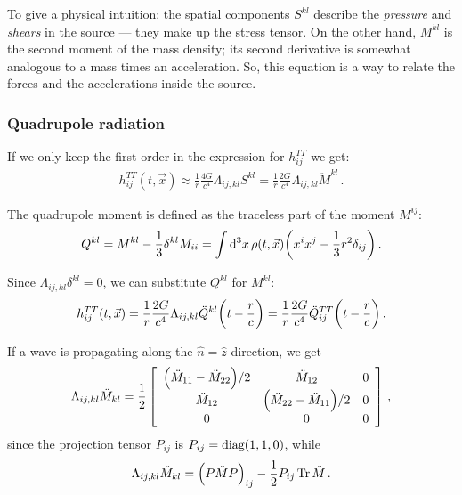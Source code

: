\documentclass[main.tex]{subfiles}
\begin{document}
To give a physical intuition: the spatial components \(S^{kl}\) describe the \emph{pressure} and \emph{shears} in the source --- they make up the stress tensor. On the other hand, \(M^{kl}\) is the second moment of the mass density; its second derivative is somewhat analogous to a mass times an acceleration. So, this equation is a way to relate the forces and the accelerations inside the source.

\subsubsection{Quadrupole radiation}

If we only keep the first order in the expression for \(h^{TT}_{ij} \) we get: 
%
\begin{align}
h_{ij}^{TT} (t, \vec{x}) \approx \frac{1}{r} \frac{4G}{c^{4}} \Lambda_{ij, kl} S^{kl}
= \frac{1}{r} \frac{2G}{c^{4}} \Lambda_{ij,kl} \ddot{M}^{kl}
\,.
\end{align}

The quadrupole moment is defined as the traceless part of the moment \(M^{ij}\):
%
\begin{align}
Q^{kl} = M^{kl} - \frac{1}{3} \delta^{kl} M_{ii} 
= \int \dd[3]{x} \rho (t, \vec{x}) \qty(x^{i} x^{j} - \frac{1}{3} r^2 \delta_{ij})
\,.
\end{align}

Since \(\Lambda_{ij, kl} \delta^{kl} =0 \), we can substitute \(Q^{kl}\) for \(M^{kl}\):
%
\begin{align} \label{eq:traceless-transverse-amplitude-from-quadrupole}
h_{ij}^{TT} (t, \vec{x}) = \frac{1}{r} \frac{2G}{c^{4}}
\Lambda_{ij, kl} \ddot{Q}^{kl} \qty(t - \frac{r}{c})
= \frac{1}{r} \frac{2G}{c^{4}} \ddot{Q}^{TT}_{ij} \qty(t - \frac{r}{c})
\,.
\end{align}

If a wave is propagating along the \(\hat{n} = \hat{z}\) direction, we get 
%
\begin{subequations}
\begin{align}
\Lambda_{ij, kl} \ddot{M}_{kl} = \frac{1}{2} \left[\begin{array}{ccc}
\qty(\ddot{M}_{11} - \ddot{M}_{22}) / 2 &  \ddot{M}_{12} & 0 \\ 
\ddot{M}_{12} & \qty(\ddot{M}_{22} - \ddot{M}_{11}) / 2 & 0 \\ 
0 & 0 & 0
\end{array}\right]
\,,
\end{align}
\end{subequations}
%
since the projection tensor \(P_{ij}\) is \(P_{ij} = \text{diag}\qty(1, 1, 0)\), while 
%
\begin{align}
\Lambda_{ij, kl} \ddot{M}_{kl} = \qty(P \ddot{M}P)_{ij} - \frac{1}{2} P_{ij} \Tr \ddot{M}
\,.
\end{align}
\end{document}
